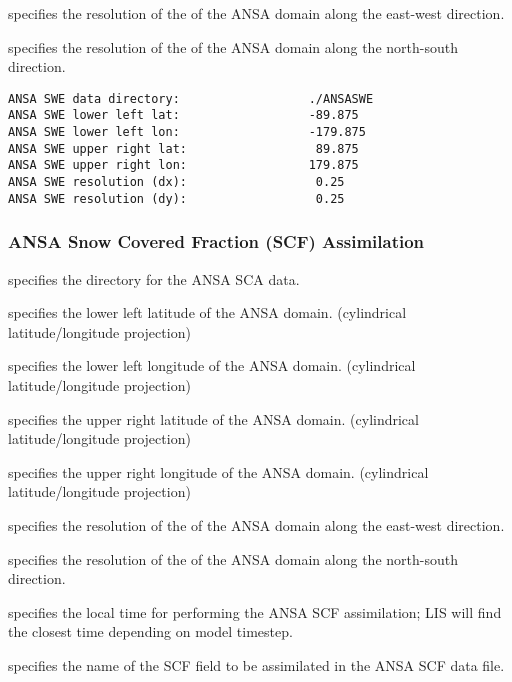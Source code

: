   specifies the resolution of the
 of the ANSA domain along the east-west direction.

  specifies the resolution of the
 of the ANSA domain along the north-south direction.
 

 \begin{Verbatim}[frame=single]
ANSA SWE data directory:                  ./ANSASWE
ANSA SWE lower left lat:                  -89.875
ANSA SWE lower left lon:                  -179.875
ANSA SWE upper right lat:                  89.875
ANSA SWE upper right lon:                 179.875
ANSA SWE resolution (dx):                  0.25
ANSA SWE resolution (dy):                  0.25
 \end{Verbatim}
 

 
 \subsubsection{ANSA Snow Covered Fraction (SCF) Assimilation}
 \label{sssec:ansascfda}
 

 
  specifies the directory for the
 ANSA SCA data.

  specifies the lower left latitude
 of the ANSA domain. (cylindrical latitude/longitude projection)

  specifies the lower left longitude
 of the ANSA domain. (cylindrical latitude/longitude projection)

  specifies the upper right latitude
 of the ANSA domain. (cylindrical latitude/longitude projection)

  specifies the upper right longitude
 of the ANSA domain. (cylindrical latitude/longitude projection)

  specifies the resolution of the
 of the ANSA domain along the east-west direction.

  specifies the resolution of the
 of the ANSA domain along the north-south direction.

  specifies the local time
 for performing the ANSA SCF assimilation; LIS will find the closest
 time depending on model timestep.

  specifies the name of the SCF field to be
 assimilated in the ANSA SCF data file.

